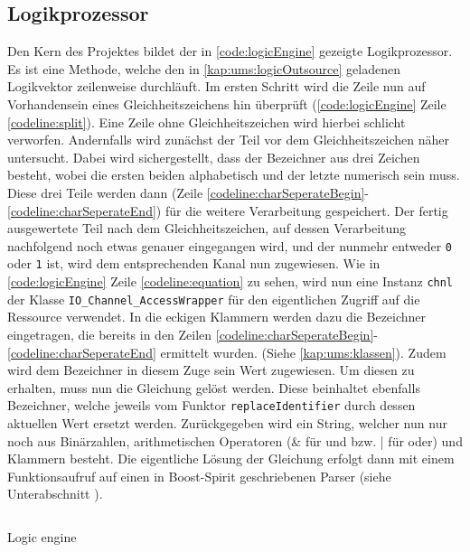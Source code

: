 \subsection{Logikprozessor}\label{kap:ums:logicProcessor}
Den Kern des Projektes bildet der in \autoref{code:logicEngine} gezeigte Logikprozessor. Es ist eine Methode, welche den in \autoref{kap:ums:logicOutsource} geladenen Logikvektor zeilenweise durchläuft. Im ersten Schritt wird die Zeile nun auf Vorhandensein eines Gleichheitszeichens hin überprüft (\autoref{code:logicEngine} Zeile \ref{codeline:split}). Eine Zeile ohne Gleichheitszeichen wird hierbei schlicht verworfen. Andernfalls wird zunächst der Teil vor dem Gleichheitszeichen näher untersucht. Dabei wird sichergestellt, dass der Bezeichner aus drei Zeichen besteht, wobei die ersten beiden alphabetisch und der letzte numerisch sein muss. Diese drei Teile werden dann (Zeile \ref{codeline:charSeperateBegin}-\ref{codeline:charSeperateEnd}) für die weitere Verarbeitung gespeichert. Der fertig ausgewertete Teil nach dem Gleichheitszeichen, auf dessen Verarbeitung nachfolgend noch etwas genauer eingegangen wird, und der nunmehr entweder \texttt{0} oder \texttt{1} ist, wird dem entsprechenden Kanal nun zugewiesen. Wie in \autoref{code:logicEngine} Zeile \ref{codeline:equation} zu sehen, wird nun eine Instanz \texttt{chnl} der Klasse \texttt{IO\_Channel\_AccessWrapper} für den eigentlichen Zugriff auf die Ressource verwendet. In die eckigen Klammern werden dazu die Bezeichner eingetragen, die bereits in den Zeilen \ref{codeline:charSeperateBegin}-\ref{codeline:charSeperateEnd} ermittelt wurden. (Siehe \autoref{kap:ums:klassen}). 
Zudem wird dem Bezeichner in diesem Zuge sein Wert zugewiesen. Um diesen zu erhalten, muss nun die Gleichung gelöst werden. Diese beinhaltet ebenfalls Bezeichner, welche jeweils vom Funktor \texttt{replaceIdentifier} durch dessen aktuellen Wert ersetzt werden. Zurückgegeben wird ein String, welcher nun nur noch aus Binärzahlen, arithmetischen Operatoren (\& für und bzw. | für oder) und Klammern besteht. Die eigentliche Lösung der Gleichung erfolgt dann mit einem Funktionsaufruf auf einen in Boost-Spirit geschriebenen Parser (siehe Unterabschnitt ). 
\begin{listing}[H]

	\inputminted[numbersep=1pt,linenos=true, mathescape, numbers=left, fontsize=\scriptsize,frame=single, firstline=186,lastline=222]{c}{./code/main-klassenstruktur.cpp}
	\caption{Logic engine}
	\label{code:logicEngine}
\end{listing}
